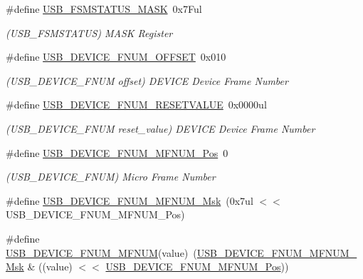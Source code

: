 \begin{DoxyCompactItemize}
\item 
\#define \mbox{\hyperlink{group___s_a_m_d21___u_s_b_ga3e8c235aa7899f43a386e292dc032763}{U\+S\+B\+\_\+\+F\+S\+M\+S\+T\+A\+T\+U\+S\+\_\+\+M\+A\+SK}}~0x7\+Ful
\begin{DoxyCompactList}\small\item\em (U\+S\+B\+\_\+\+F\+S\+M\+S\+T\+A\+T\+US) M\+A\+SK Register \end{DoxyCompactList}\item 
\#define \mbox{\hyperlink{group___s_a_m_d21___u_s_b_ga04c4c55b4b6a088cb4ec0b8ab8e5c3ef}{U\+S\+B\+\_\+\+D\+E\+V\+I\+C\+E\+\_\+\+F\+N\+U\+M\+\_\+\+O\+F\+F\+S\+ET}}~0x010
\begin{DoxyCompactList}\small\item\em (U\+S\+B\+\_\+\+D\+E\+V\+I\+C\+E\+\_\+\+F\+N\+UM offset) D\+E\+V\+I\+CE Device Frame Number \end{DoxyCompactList}\item 
\#define \mbox{\hyperlink{group___s_a_m_d21___u_s_b_ga9d1519b7871620f47daa5eb8495813ad}{U\+S\+B\+\_\+\+D\+E\+V\+I\+C\+E\+\_\+\+F\+N\+U\+M\+\_\+\+R\+E\+S\+E\+T\+V\+A\+L\+UE}}~0x0000ul
\begin{DoxyCompactList}\small\item\em (U\+S\+B\+\_\+\+D\+E\+V\+I\+C\+E\+\_\+\+F\+N\+UM reset\+\_\+value) D\+E\+V\+I\+CE Device Frame Number \end{DoxyCompactList}\item 
\#define \mbox{\hyperlink{group___s_a_m_d21___u_s_b_gaf97acec612af7f6fd13b6a72cd73c3d5}{U\+S\+B\+\_\+\+D\+E\+V\+I\+C\+E\+\_\+\+F\+N\+U\+M\+\_\+\+M\+F\+N\+U\+M\+\_\+\+Pos}}~0
\begin{DoxyCompactList}\small\item\em (U\+S\+B\+\_\+\+D\+E\+V\+I\+C\+E\+\_\+\+F\+N\+UM) Micro Frame Number \end{DoxyCompactList}\item 
\#define \mbox{\hyperlink{group___s_a_m_d21___u_s_b_gab7807c69c8d6f504977d03aa278a569a}{U\+S\+B\+\_\+\+D\+E\+V\+I\+C\+E\+\_\+\+F\+N\+U\+M\+\_\+\+M\+F\+N\+U\+M\+\_\+\+Msk}}~(0x7ul $<$$<$ U\+S\+B\+\_\+\+D\+E\+V\+I\+C\+E\+\_\+\+F\+N\+U\+M\+\_\+\+M\+F\+N\+U\+M\+\_\+\+Pos)
\item 
\#define \mbox{\hyperlink{group___s_a_m_d21___u_s_b_ga09b34cbf19e0f78d280e933b67a81002}{U\+S\+B\+\_\+\+D\+E\+V\+I\+C\+E\+\_\+\+F\+N\+U\+M\+\_\+\+M\+F\+N\+UM}}(value)~(\mbox{\hyperlink{group___s_a_m_d21___u_s_b_gab7807c69c8d6f504977d03aa278a569a}{U\+S\+B\+\_\+\+D\+E\+V\+I\+C\+E\+\_\+\+F\+N\+U\+M\+\_\+\+M\+F\+N\+U\+M\+\_\+\+Msk}} \& ((value) $<$$<$ \mbox{\hyperlink{group___s_a_m_d21___u_s_b_gaf97acec612af7f6fd13b6a72cd73c3d5}{U\+S\+B\+\_\+\+D\+E\+V\+I\+C\+E\+\_\+\+F\+N\+U\+M\+\_\+\+M\+F\+N\+U\+M\+\_\+\+Pos}}))

\end{DoxyCompactItemize}
